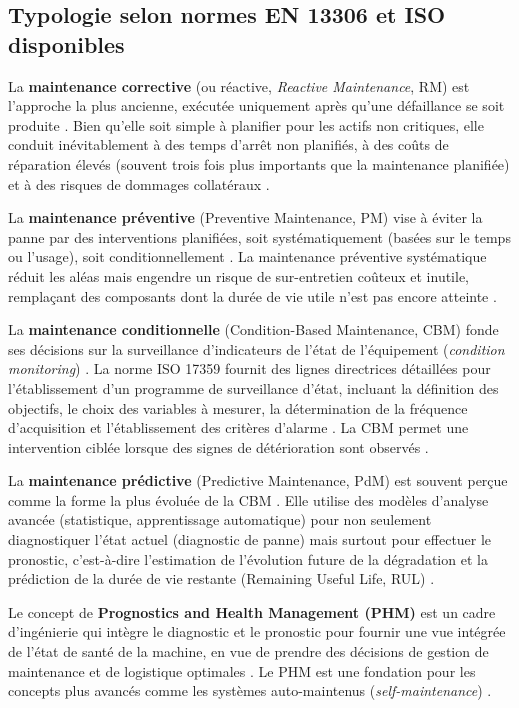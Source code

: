 \subsection{Typologie selon normes EN 13306 et ISO disponibles}

La \textbf{maintenance corrective} (ou réactive, \textit{Reactive Maintenance}, RM) est l'approche la plus ancienne, exécutée uniquement après qu'une défaillance se soit produite \cite{en13306,ran2019}. Bien qu'elle soit simple à planifier pour les actifs non critiques, elle conduit inévitablement à des temps d'arrêt non planifiés, à des coûts de réparation élevés (souvent trois fois plus importants que la maintenance planifiée) et à des risques de dommages collatéraux \cite{ran2019}.

La \textbf{maintenance préventive} (Preventive Maintenance, PM) vise à éviter la panne par des interventions planifiées, soit systématiquement (basées sur le temps ou l'usage), soit conditionnellement \cite{en13306,ran2019}. La maintenance préventive systématique réduit les aléas mais engendre un risque de sur-entretien coûteux et inutile, remplaçant des composants dont la durée de vie utile n'est pas encore atteinte \cite{ran2019}.

La \textbf{maintenance conditionnelle} (Condition-Based Maintenance, CBM) fonde ses décisions sur la surveillance d'indicateurs de l'état de l'équipement (\textit{condition monitoring}) \cite{en13306,iso17359}. La norme ISO 17359 fournit des lignes directrices détaillées pour l'établissement d'un programme de surveillance d'état, incluant la définition des objectifs, le choix des variables à mesurer, la détermination de la fréquence d'acquisition et l'établissement des critères d'alarme \cite{iso17359,achouch2022}. La CBM permet une intervention ciblée lorsque des signes de détérioration sont observés \cite{lee2014}.

La \textbf{maintenance prédictive} (Predictive Maintenance, PdM) est souvent perçue comme la forme la plus évoluée de la CBM \cite{achouch2022,lee2014,jardine2006}. Elle utilise des modèles d'analyse avancée (statistique, apprentissage automatique) pour non seulement diagnostiquer l'état actuel (diagnostic de panne) mais surtout pour effectuer le pronostic, c'est-à-dire l'estimation de l'évolution future de la dégradation et la prédiction de la durée de vie restante (Remaining Useful Life, RUL) \cite{lee2014,ran2019}.

Le concept de \textbf{Prognostics and Health Management (PHM)} est un cadre d'ingénierie qui intègre le diagnostic et le pronostic pour fournir une vue intégrée de l'état de santé de la machine, en vue de prendre des décisions de gestion de maintenance et de logistique optimales \cite{lee2014,achouch2022}. Le PHM est une fondation pour les concepts plus avancés comme les systèmes auto-maintenus (\textit{self-maintenance}) \cite{lee2014}.

